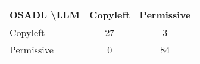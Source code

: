 \begin{tabular}{l|cc}\hline
	\textbf{OSADL \textbackslash LLM} & Copyleft & Permissive\\\hline
	Copyleft & 27 & 3\\
	Permissive & 0 & 84\\\hline
\end{tabular}
